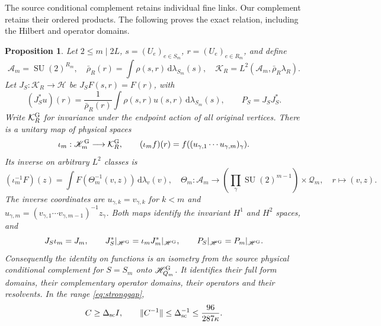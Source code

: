 \documentclass[11pt]{article}
\newtheorem{proposition}[theorem]{Proposition}
\newcommand{\SU}{\operatorname{SU}}
\newcommand{\dd}{\,\mathrm d}
\newcommand{\HH}{\mathscr H}
\newcommand{\KK}{\mathscr K}
\begin{document}
The source conditional complement retains individual fine links.
Our complement retains their ordered products. The following proves
the exact relation, including the Hilbert and operator domains.

\begin{proposition}\label{prop:physicalbridge}
Let $2\leq m\mid2L$, $s=(U_e)_{e\in S_m}$,
$r=(U_e)_{e\in R_m}$, and define
\[
 \mathcal A_m=\SU(2)^{R_m},\quad
 \bar\rho_R(r)=\int\rho(s,r)\dd\lambda_{S_m}(s),\quad
 \mathcal K_R=L^2(\mathcal A_m,\bar\rho_R\lambda_R).
\]
Let $J_S:\mathcal K_R\to\HH$ be $J_SF(s,r)=F(r)$, with
\[
 (J_S^*u)(r)=\frac{1}{\bar\rho_R(r)}
                \int\rho(s,r)u(s,r)\dd\lambda_{S_m}(s),
 \qquad P_S=J_SJ_S^*.
\]
Write $\mathcal K_R^{\rm G}$ for invariance under the endpoint action
of all original vertices. There is a unitary map of physical spaces
\begin{equation}\label{eq:skeletonunitary}
 \iota_m:\KK_m^{\rm G}\longrightarrow\mathcal K_R^{\rm G},
 \qquad (\iota_m f)(r)=f((u_{\gamma,1}\cdots u_{\gamma,m})_\gamma).
\end{equation}
Its inverse on arbitrary $L^2$ classes is
\begin{equation}\label{eq:skeletoninverse}
 (\iota_m^{-1}F)(z)=\int F(\Theta_m^{-1}(v,z))\dd\lambda_v(v),
 \quad
 \Theta_m:\mathcal A_m\longrightarrow
 \left(\prod_\gamma\SU(2)^{m-1}\right)\times\mathcal Q_m,
 \quad r\longmapsto(v,z).
\end{equation}
The inverse coordinates are $u_{\gamma,k}=v_{\gamma,k}$ for $k<m$
and $u_{\gamma,m}=(v_{\gamma,1}\cdots v_{\gamma,m-1})^{-1}z_\gamma$.
Both maps identify the invariant $H^1$ and $H^2$ spaces, and
\begin{equation}\label{eq:physicalprojections}
 J_S\iota_m=J_m,
 \qquad J_S^*|_{\HH^{\rm G}}=\iota_mJ_m^*|_{\HH^{\rm G}},
 \qquad P_S|_{\HH^{\rm G}}=P_m|_{\HH^{\rm G}}.
\end{equation}
Consequently the identity on functions is an isometry from the
source physical conditional complement for $S=S_m$ onto
$\HH_{Q_m}^{\rm G}$. It identifies their full form domains,
their complementary operator domains, their operators and their
resolvents. In the range \eqref{eq:stronggap},
\begin{equation}\label{eq:uniformC}
 C\geq\Delta_{\rm sc} I,\qquad
 \|C^{-1}\|\leq\Delta_{\rm sc}^{-1}
                  \leq\frac{96}{287\kappa}.
\end{equation}
\end{proposition}
\end{document}

